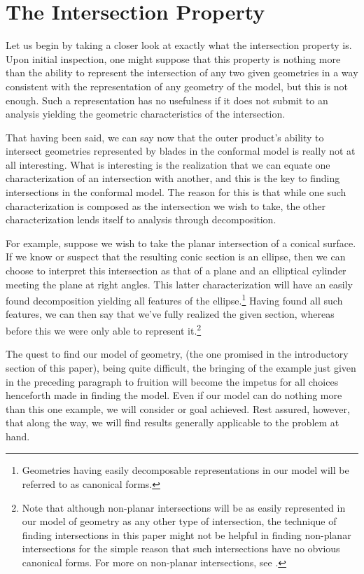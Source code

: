 \documentclass{birkjour}
\theoremstyle{definition}
\theoremstyle{remark}
\numberwithin{equation}{section}
\begin{document}
\section{The Intersection Property}

Let us begin by taking a closer look at exactly what the intersection property is.
Upon initial inspection, one might suppose that this property is nothing more than
the ability to represent the intersection of any two given geometries in a way consistent
with the representation of any geometry of the model, but this is not
enough.  Such a representation has no usefulness if it does not submit to an
analysis yielding the geometric characteristics of the intersection.

That having been said, we can say now that the outer product's ability to intersect geometries represented
by blades in the conformal model is really not at all interesting.  What is interesting
is the realization that we can equate one characterization of an intersection
with another, and this is the key to finding intersections in the conformal model.
The reason for this is that while one such characterization is composed as the
intersection we wish to take, the other characterization lends itself to
analysis through decomposition.

For example, suppose we wish to take the planar intersection of a conical surface.
If we know or suspect that the resulting conic section is an ellipse, then we can choose to
interpret this intersection as that of a plane and an elliptical cylinder meeting
the plane at right angles.  This latter characterization will have an easily found decomposition
yielding all features of the ellipse.\footnote{Geometries having easily decomposable
representations in our model will be referred to as canonical forms.}
Having found all such features, we can then say that we've
fully realized the given section, whereas before this we were only able to
represent it.\footnote{Note that although non-planar intersections will be as easily
represented in our model of geometry as any other type of intersection,
the technique of finding intersections in this paper
might not be helpful in finding non-planar intersections for the simple reason that such intersections
have no obvious canonical forms.  For more on non-planar intersections, see \cite{Miller87}.}

The quest to find our model of geometry, (the one promised in the introductory section of
this paper), being quite difficult, the bringing of the example just given in the preceding paragraph
to fruition will become the impetus for all choices henceforth made in finding the model.
Even if our model can do nothing more than this one example, we will consider or goal achieved.
Rest assured, however, that along the way, we will find results generally applicable to the problem at hand.
\end{document}
